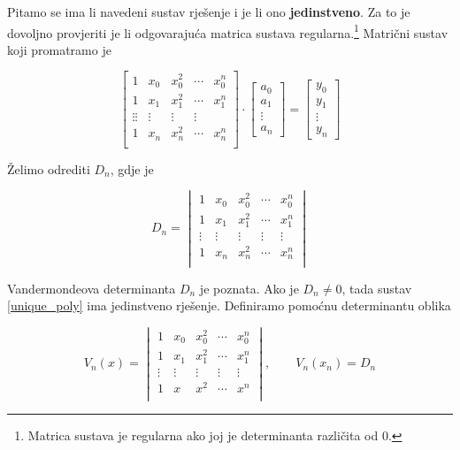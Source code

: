 Pitamo se ima li navedeni sustav rješenje i je li ono \textbf{jedinstveno}.
Za to je dovoljno provjeriti je li odgovarajuća matrica sustava regularna.\footnote{Matrica sustava je regularna ako joj je determinanta različita od 0.}
Matrični sustav koji promatramo je

\begin{equation}
    \label{unique_poly}
    \begin{bmatrix}
        1&x_0&x_0^2&\cdots&x_0^n\\
        1&x_1&x_1^2&\cdots&x_1^n\\
        \vdots\vdots&\vdots&\vdots&\vdots\\
        1&x_n&x_n^2&\cdots&x_n^n\\
    \end{bmatrix}
    \cdot
    \begin{bmatrix}
        a_0\\
        a_1\\
        \vdots\\
        a_n
    \end{bmatrix}
    =
    \begin{bmatrix}
        y_0\\
        y_1\\
        \vdots\\
        y_n
    \end{bmatrix}
\end{equation}

Želimo odrediti $D_n$, gdje je

$$
D_n = \begin{vmatrix}
    1&x_0&x_0^2&\cdots&x_0^n\\
    1&x_1&x_1^2&\cdots&x_1^n\\
    \vdots&\vdots&\vdots&\vdots&\vdots\\
    1&x_n&x_n^2&\cdots&x_n^n\\
\end{vmatrix}
$$

\newpage

Vandermondeova determinanta $D_n$ je poznata.
Ako je $D_n \neq 0$, tada sustav \ref{unique_poly} ima jedinstveno rješenje.
Definiramo pomoćnu determinantu oblika

$$
V_n(x) = \begin{vmatrix}
    1&x_0&x_0^2&\cdots&x_0^n\\
    1&x_1&x_1^2&\cdots&x_1^n\\
    \vdots&\vdots&\vdots&\vdots&\vdots\\
    1&x&x^2&\cdots&x^n\\
\end{vmatrix},
\qquad V_n(x_n) = D_n
$$

